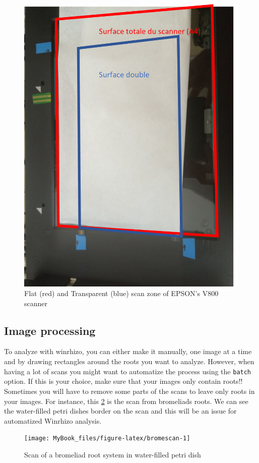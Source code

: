 \documentclass[
  12pt,
  american,
  a4paper,
  extrafontsizes,onecolumn,openright
  ]{memoir}
\begin{document}
\begin{figure}

{\centering \includegraphics[width=0.5\linewidth]{document/trait/rootmorpho/scan_transp} 

}

\caption{Flat (red) and Transparent (blue) scan zone of EPSON's V800 scanner}\label{fig:scantransp}
\end{figure}

\normalsize

\hypertarget{image-processing}{%
\subsection{Image processing}\label{image-processing}}

To analyze with winrhizo, you can either make it manually, one image at a time and by drawing rectangles around the roots you want to analyze.
However, when having a lot of scans you might want to automatize the process using the \texttt{batch} option.
If this is your choice, make sure that your images only contain roots!! Sometimes you will have to remove some parts of the scans to leave only roots in your images.
For instance, this \ref{fig:bromescan} is the scan from bromeliads roots. We can see the water-filled petri dishes border on the scan and this will be an issue for automatized Winrhizo analysis.

\scriptsize

\begin{figure}

{\centering \texttt{[image: MyBook\_files/figure-latex/bromescan-1]} 

}

\caption{Scan of a bromeliad root system in water-filled petri dish}\label{fig:bromescan}
\end{figure}
\end{document}
